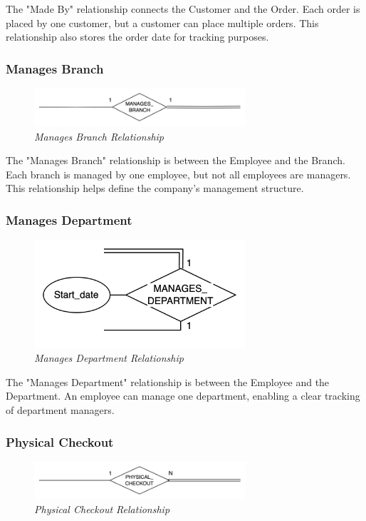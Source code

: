 The "Made By" relationship connects the Customer and the Order. Each order is placed by one customer, but a customer can place multiple orders. This relationship also stores the order date for tracking purposes.

\subsubsection{Manages Branch}
\begin{figure}[H]
  \centering
  \includegraphics[width=0.7\textwidth]{images/relationships/manages_branch.png}
  \caption{\textit{Manages Branch Relationship}}
\end{figure}

The "Manages Branch" relationship is between the Employee and the Branch. Each branch is managed by one employee, but not all employees are managers. This relationship helps define the company's management structure.

\subsubsection{Manages Department}
\begin{figure}[H]
  \centering
  \includegraphics[width=0.7\textwidth]{images/relationships/manages_department.png}
  \caption{\textit{Manages Department Relationship}}
\end{figure}

The "Manages Department" relationship is between the Employee and the Department. An employee can manage one department, enabling a clear tracking of department managers.

\subsubsection{Physical Checkout}
\begin{figure}[H]
  \centering
  \includegraphics[width=0.7\textwidth]{images/relationships/physical_checkout.png}
  \caption{\textit{Physical Checkout Relationship}}
\end{figure}

